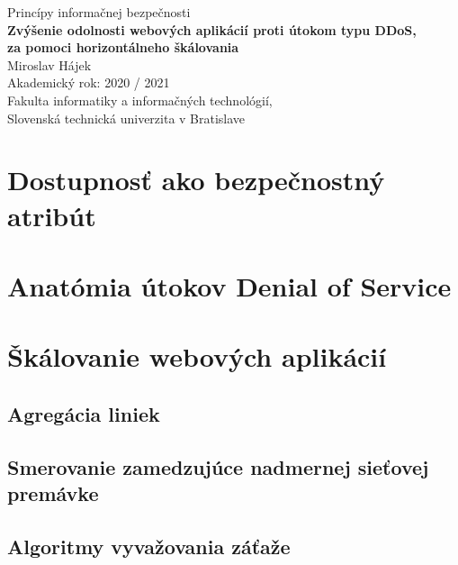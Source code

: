 \documentclass[11pt, a4paper]{article}
\begin{document}
\begin{titlepage}
    \hspace{0pt}
    \centering
    \vfill
    \large Princípy informačnej bezpečnosti \\
    \vspace{0.4cm}
    \vspace{1cm}
    \Large \textbf{ Zvýšenie odolnosti webových aplikácií proti útokom typu DDoS, 
          \\za pomoci horizontálneho škálovania  \\}
    \vspace{2.5cm}
    \normalsize Miroslav Hájek \\[0.2cm]
	Akademický rok: 2020 / 2021 \\[0.1cm]
	Fakulta informatiky a informačných technológií, \\
	Slovenská technická univerzita v Bratislave
    \vfill
\end{titlepage}



\tableofcontents
{}
\setcounter{page}{1}

\section{Dostupnosť ako bezpečnostný atribút}


\section{Anatómia útokov Denial of Service}


\section{Škálovanie webových aplikácií}

\subsection{Agregácia liniek}

\subsection{Smerovanie zamedzujúce nadmernej sieťovej premávke}

\subsection{Algoritmy vyvažovania záťaže}
\end{document}
